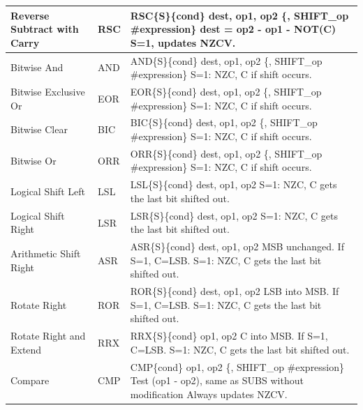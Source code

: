 \documentclass[../comorg-part1.tex]{subfiles}
\begin{document}
\begin{landscape}
\begin{longtable}{|p{4cm}|l|p{16cm}|}
Reverse Subtract with Carry & RSC & \ttfamily RSC\{S\}\{cond\} dest, op1, op2 \{, SHIFT\_op \#expression\} \newline dest = op2 - op1 - NOT(C) \newline S=1, updates NZCV. \\ \hline
Bitwise And & AND & \ttfamily AND\{S\}\{cond\} dest, op1, op2 \{, SHIFT\_op \#expression\} \newline S=1: NZC, C if shift occurs. \\ \hline
Bitwise Exclusive Or & EOR & \ttfamily EOR\{S\}\{cond\} dest, op1, op2 \{, SHIFT\_op \#expression\} \newline S=1: NZC, C if shift occurs. \\ \hline
Bitwise Clear & BIC & \ttfamily BIC\{S\}\{cond\} dest, op1, op2 \{, SHIFT\_op \#expression\} \newline S=1: NZC, C if shift occurs. \\ \hline
Bitwise Or & ORR & \ttfamily ORR\{S\}\{cond\} dest, op1, op2 \{, SHIFT\_op \#expression\} \newline S=1: NZC, C if shift occurs. \\ \hline
Logical Shift Left & LSL & \ttfamily LSL\{S\}\{cond\} dest, op1, op2 \newline S=1: NZC, C gets the last bit shifted out. \\ \hline
Logical Shift Right & LSR & \ttfamily LSR\{S\}\{cond\} dest, op1, op2 \newline S=1: NZC, C gets the last bit shifted out. \\ \hline
Arithmetic Shift Right & ASR & \ttfamily ASR\{S\}\{cond\} dest, op1, op2 \newline MSB unchanged. If S=1, C=LSB. \newline S=1: NZC, C gets the last bit shifted out. \\ \hline
Rotate Right & ROR & \ttfamily ROR\{S\}\{cond\} dest, op1, op2 \newline LSB into MSB. If S=1, C=LSB. \newline S=1: NZC, C gets the last bit shifted out. \\ \hline
Rotate Right and Extend & RRX & \ttfamily RRX\{S\}\{cond\} op1, op2 \newline C into MSB. If S=1, C=LSB. \newline S=1: NZC, C gets the last bit shifted out. \\ \hline
Compare & CMP & \ttfamily CMP\{cond\} op1, op2 \{, SHIFT\_op \#expression\} \newline Test (op1 - op2), same as SUBS without modification \newline Always updates NZCV. \\ \hline

\end{longtable}
\end{landscape}
\end{document}
